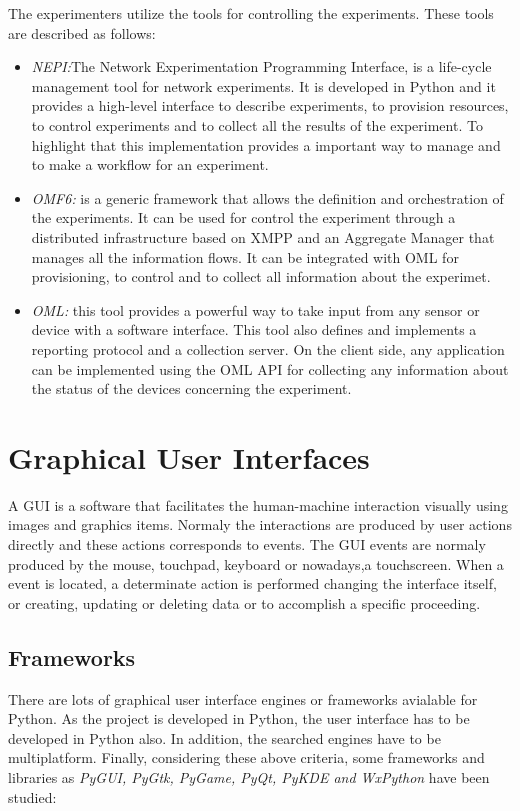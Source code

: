 The experimenters utilize the tools for controlling the experiments. These tools
are described as follows:
\begin{itemize}
\item \emph{NEPI:}The Network Experimentation Programming Interface, is a
  life-cycle management tool for network experiments. It is developed in Python
  and it provides a high-level interface to describe experiments, to provision
  resources, to control experiments and to collect all the results of the
  experiment. To highlight that this implementation provides a important way to
  manage and to make a workflow for an experiment.
\item \emph{\ac{OMF6}:} is a generic framework that allows the definition and
  orchestration of the experiments. It can be used for control the experiment
  through a distributed infrastructure based on \ac{XMPP} and an Aggregate Manager
  that manages all the information flows. It can be integrated with \ac{OML} for
  provisioning, to control and to collect all information about the experimet.
\item \emph{\ac{OML}:} this tool provides a powerful way to take input from any
  sensor or device with a software interface. This tool also defines and
  implements a reporting protocol and a collection server. On the client side,
  any application can be implemented using the \ac{OML} \ac{API} for collecting any
  information about the status of the devices concerning the experiment. 
\end{itemize}


\section{Graphical User Interfaces}

A \ac{GUI} is a software that facilitates the human-machine interaction
visually using images and graphics items. Normaly the interactions are produced
by user actions directly and these actions corresponds to events. The \ac{GUI} events
are normaly produced by the mouse, touchpad, keyboard or nowadays,a
touchscreen. When a event is located, a determinate action is performed
changing the interface itself, or creating, updating or deleting data or to
accomplish a specific proceeding. 


\subsection{Frameworks}

There are lots of graphical user interface engines or frameworks avialable for
Python. As the project is developed in Python, the user interface has to be
developed in Python also. In addition, the searched engines have to be
multiplatform. Finally, considering these above criteria, some frameworks and
libraries  as \emph{PyGUI, PyGtk, PyGame, PyQt, PyKDE and WxPython} have been studied:

